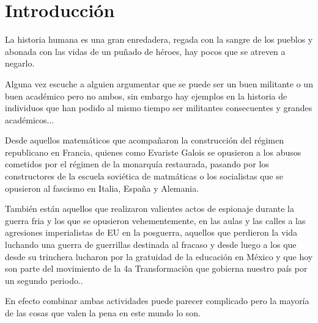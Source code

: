 \chapter{Introducción}

La historia humana es una gran enredadera, regada con la sangre de los pueblos y abonada con las vidas de un puñado de héroes, hay pocos que se atreven a negarlo. 


Alguna vez escuche a alguien argumentar que se puede ser un buen militante o un buen académico pero no ambos, sin embargo hay ejemplos en la historia de individuos que han podido al mismo tiempo ser militantes consecuentes y grandes académicos...

Desde aquellos matemáticos que acompañaron la construcción del régimen republicano en Francia, quienes como Evariste Galois se opusieron a los abusos cometidos por el régimen de la monarquía restaurada, pasando por los constructores de la escuela soviética de matmáticas o los socialistas que se opusieron al fascismo en Italia, España y Alemania. 

También están aquellos que realizaron valientes actos de espionaje durante la guerra fria y los que se opusieron vehementemente, en las aulas y las calles a las agresiones imperialistas de EU en la posguerra, aquellos que perdieron la vida luchando una guerra de guerrillas destinada al fracaso y desde luego a  los que desde su trinchera lucharon por la gratuidad de la educación en México y que hoy son parte del movimiento de la 4a Transformaciòn que gobierna nuestro país por un segundo periodo..

En efecto combinar ambas actividades puede parecer complicado pero la mayoría de las cosas que valen la pena en este mundo lo son.

